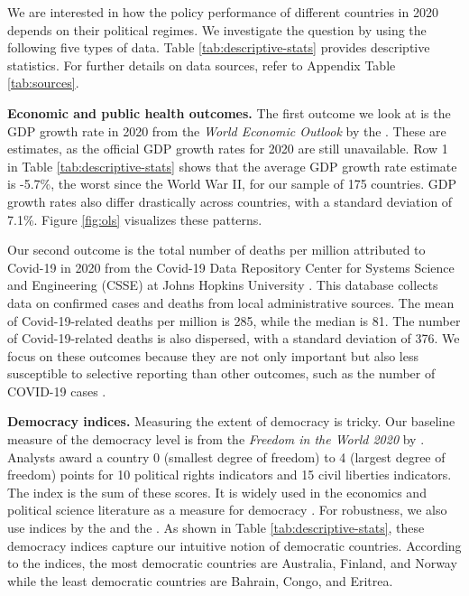 We are interested in how the policy performance of different countries in 2020 depends on their political regimes. 
We investigate the question by using the following five types of data. Table \ref{tab:descriptive-stats} provides descriptive statistics. For further details on data sources, refer to Appendix Table \ref{tab:sources}. 

\textbf{Economic and public health outcomes.} The first outcome we look at is the GDP growth rate in 2020 from the \emph{World Economic Outlook} by the \citet{internationalmonetaryfundWorldEconomicOutlook2020}. These are estimates, as the official GDP growth rates for 2020 are still unavailable. Row 1 in Table \ref{tab:descriptive-stats} shows that the average GDP growth rate estimate is -5.7\%, the worst since the World War II, for our sample of 175 countries. GDP growth rates also differ drastically across countries, with a standard deviation of 7.1\%. Figure \ref{fig:ols} visualizes these patterns. 

Our second outcome is the total number of deaths per million attributed to Covid-19 in 2020 from the Covid-19 Data Repository Center for Systems Science and Engineering (CSSE) at Johns Hopkins University \citep{dongInteractiveWebbasedDashboard2020}. This database collects data on confirmed cases and deaths from local administrative sources. The mean of Covid-19-related deaths per million is 285, while the median is 81. The number of Covid-19-related deaths is also dispersed, with a standard deviation of 376. We focus on these outcomes because they are not only important but also less susceptible to selective reporting than other outcomes, such as the number of COVID-19 cases \citep{fisher2020assessing}.


\textbf{Democracy indices.} Measuring the extent of democracy is tricky. Our baseline measure of the democracy level is from the \emph{Freedom in the World 2020} by \citet{freedomhouseFreedomWorld20202020}. Analysts award a country 0 (smallest degree of freedom) to 4 (largest degree of freedom) points for 10 political rights indicators and 15 civil liberties indicators. The index is the sum of these scores. It is widely used in the economics and political science literature as a measure for democracy \citep{barroDeterminantsDemocracy, freyDemocracyCultureContagion2020, spilimbergodemocracyForeignEducation,  stepan2003arab}. For robustness, we also use indices by the \citet{centerforsystemicpeacePolity5AnnualTime2018} and the \citet{DemocracyIndex2020}. As shown in Table \ref{tab:descriptive-stats}, these democracy indices capture our intuitive notion of democratic countries. According to the indices, the most democratic countries are Australia, Finland, and Norway while the least democratic countries are Bahrain, Congo, and Eritrea. 

